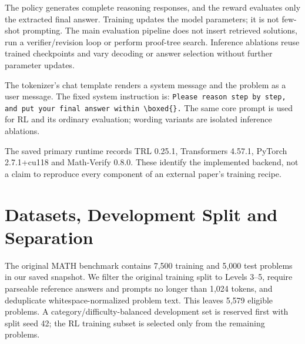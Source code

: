The policy generates complete reasoning responses, and the reward evaluates only the extracted final answer. Training updates the model parameters; it is not few-shot prompting. The main evaluation pipeline does not insert retrieved solutions, run a verifier/revision loop or perform proof-tree search. Inference ablations reuse trained checkpoints and vary decoding or answer selection without further parameter updates.

The tokenizer's chat template renders a system message and the problem as a user message. The fixed system instruction is: \texttt{Please reason step by step, and put your final answer within \textbackslash boxed\{\}.} The same core prompt is used for RL and its ordinary evaluation; wording variants are isolated inference ablations.

The saved primary runtime records TRL 0.25.1, Transformers 4.57.1, PyTorch 2.7.1+cu118 and Math-Verify 0.8.0. These identify the implemented backend, not a claim to reproduce every component of an external paper's training recipe.

\clearpage

\section{Datasets, Development Split and Separation}

The original MATH benchmark contains 7,500 training and 5,000 test problems in our saved snapshot. We filter the original training split to Levels 3--5, require parseable reference answers and prompts no longer than 1,024 tokens, and deduplicate whitespace-normalized problem text. This leaves 5,579 eligible problems. A category/difficulty-balanced development set is reserved first with split seed 42; the RL training subset is selected only from the remaining problems.


